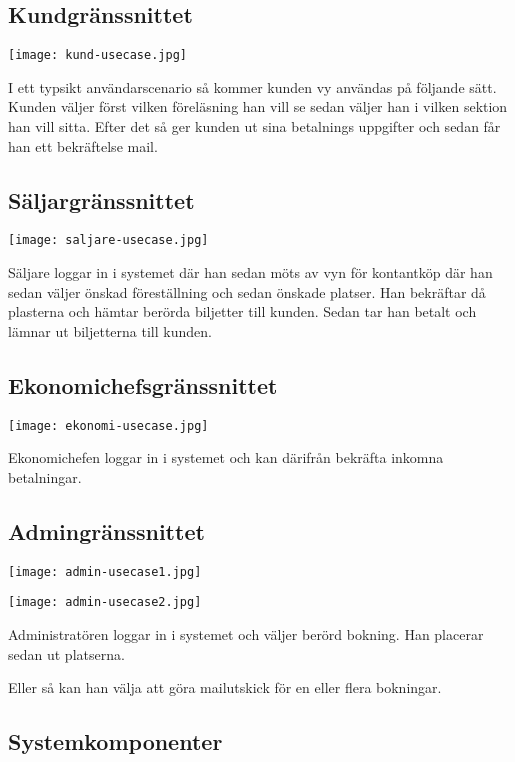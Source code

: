 \documentclass[a4paper, twoside, 11pt, titlepage]{article}
\begin{document}
	\subsection{Kundgränssnittet}


	\texttt{[image: kund-usecase.jpg]}

	I ett typsikt användarscenario så kommer kunden vy användas på följande sätt. Kunden väljer först vilken föreläsning han vill se sedan väljer han i vilken sektion han vill sitta. Efter det så ger kunden ut sina betalnings uppgifter och sedan får han ett bekräftelse mail.

	\subsection{Säljargränssnittet}


	\texttt{[image: saljare-usecase.jpg]}

	Säljare loggar in i systemet där han sedan möts av vyn för kontantköp där han sedan väljer önskad föreställning och sedan önskade platser. Han bekräftar då plasterna och hämtar berörda biljetter till kunden. Sedan tar han betalt och lämnar ut biljetterna till kunden.

	\subsection{Ekonomichefsgränssnittet}


	\texttt{[image: ekonomi-usecase.jpg]}

	Ekonomichefen loggar in i systemet och kan därifrån bekräfta inkomna betalningar.

	\subsection{Admingränssnittet}


	\texttt{[image: admin-usecase1.jpg]}

	\texttt{[image: admin-usecase2.jpg]}

	Administratören loggar in i systemet och väljer berörd bokning. Han placerar sedan ut platserna.

	Eller så kan han välja att göra mailutskick för en eller flera bokningar.

	\subsection{Systemkomponenter}
\end{document}
